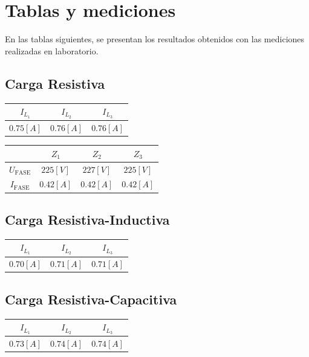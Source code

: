 \documentclass[letter,11pt]{article}
\begin{document}
\section{Tablas y mediciones}
En las tablas siguientes, se presentan los resultados obtenidos con las
mediciones realizadas en laboratorio.

\subsection{Carga Resistiva}

\begin{center}
    \begin{tabular}{|c|c|c|}
    \hline
    $I_{L_1}$ & $I_{L_2}$ & $I_{L_3}$
    \tabularnewline \hline \hline
    $0.75[A]$ & $0.76[A]$ & $0.76[A]$
    \tabularnewline \hline
    \end{tabular}
\end{center}

\begin{center}
    \begin{tabular}{|c||c|c|c|}
    \hline
    & $Z_{1}$ & $Z_{2}$ & $Z_{3}$
    \tabularnewline \hline \hline
    $U_{\text{FASE}}$ & $225[V]$ & $227[V]$ & $225[V]$
    \tabularnewline \hline
    $I_{\text{FASE}}$ & $0.42[A]$ & $0.42[A]$ & $0.42[A]$
    \tabularnewline \hline
    \end{tabular}
\end{center}

\subsection{Carga Resistiva-Inductiva}

\begin{center}
    \begin{tabular}{|c|c|c|}
    \hline
    $I_{L_1}$ & $I_{L_2}$ & $I_{L_3}$
    \tabularnewline \hline \hline
    $0.70[A]$ & $0.71[A]$ & $0.71[A]$
    \tabularnewline \hline
    \end{tabular}
\end{center}

\subsection{Carga Resistiva-Capacitiva}

\begin{center}
    \begin{tabular}{|c|c|c|}
    \hline
    $I_{L_1}$ & $I_{L_2}$ & $I_{L_3}$
    \tabularnewline \hline \hline
    $0.73[A]$ & $0.74[A]$ & $0.74[A]$
    \tabularnewline \hline
    \end{tabular}
\end{center}
\end{document}
